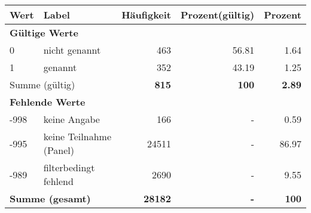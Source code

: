      \begin{longtable}{lXrrr}
     \toprule
     \textbf{Wert} & \textbf{Label} & \textbf{Häufigkeit} & \textbf{Prozent(gültig)} & \textbf{Prozent} \\
     \endhead
     \midrule
     \multicolumn{5}{l}{\textbf{Gültige Werte}}\\

     0 &
     \multicolumn{1}{X}{ nicht genannt   } &


       \num{463} &
       \num[round-mode=places,round-precision=2]{56.81} &
         \num[round-mode=places,round-precision=2]{1.64} \\

     1 &
     \multicolumn{1}{X}{ genannt   } &


       \num{352} &
       \num[round-mode=places,round-precision=2]{43.19} &
         \num[round-mode=places,round-precision=2]{1.25} \\
     \midrule
     \multicolumn{2}{l}{Summe (gültig)} &
       \textbf{\num{815}} &
     \textbf{\num{100}} &
       \textbf{\num[round-mode=places,round-precision=2]{2.89}} \\
     \multicolumn{5}{l}{\textbf{Fehlende Werte}}\\
       -998 &
       keine Angabe &
         \num{166} &
        - &
         \num[round-mode=places,round-precision=2]{0.59} \\
       -995 &
       keine Teilnahme (Panel) &
         \num{24511} &
        - &
         \num[round-mode=places,round-precision=2]{86.97} \\
       -989 &
       filterbedingt fehlend &
         \num{2690} &
        - &
         \num[round-mode=places,round-precision=2]{9.55} \\
     \midrule
     \multicolumn{2}{l}{\textbf{Summe (gesamt)}} &
          \textbf{\num{28182}} &
        \textbf{-} &
        \textbf{\num{100}} \\
     \bottomrule
     \end{longtable}
     
